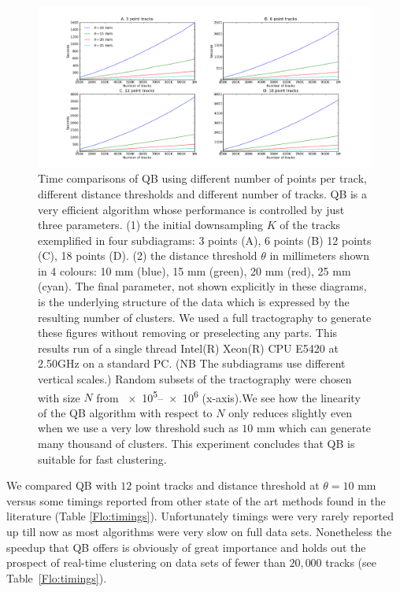 \documentclass[preprint,authoryear,a4paper,10pt,onecolumn]{elsarticle}
\begin{document}
\begin{figure}
\noindent \begin{centering}
\includegraphics[scale=0.33]{2x2+leg-box}
\par\end{centering}
\caption{Time comparisons of QB using different number of points per
  track, different distance thresholds and different number of
  tracks. QB is a very efficient algorithm whose performance is
  controlled by just three parameters. (1) the initial downsampling $K$
  of the tracks exemplified in four subdiagrams: 3 points (A), 6 points
  (B) 12 points (C), 18 points (D). (2) the distance threshold $\theta$
  in millimeters shown in 4 colours: 10 mm (blue), 15 mm (green), 20 mm
  (red), 25 mm (cyan). The final parameter, not shown explicitly in
  these diagrams, is the underlying structure of the data which is
  expressed by the resulting number of clusters.  We used a full
  tractography to generate these figures without removing or
  preselecting any parts. This results run of a single thread Intel(R)
  Xeon(R) CPU E5420 at 2.50GHz on a standard PC. (NB The subdiagrams use
  different vertical scales.) Random subsets of the tractography were
  chosen with size $N$ from \numrange{e5}{e6} (x-axis).We see how the
  linearity of the QB algorithm with respect to $N$ only reduces
  slightly even when we use a very low threshold such as $10$ mm which
  can generate many thousand of clusters. This experiment concludes that
  QB is suitable for fast clustering.\label{Flo:Speed1}}
\end{figure}

We compared QB with $12$ point tracks and distance threshold at
$\theta=10$ mm versus some timings reported from other state of the art
methods found in the literature (Table \ref{Flo:timings}). Unfortunately
timings were very rarely reported up till now as most algorithms were
very slow on full data sets. Nonetheless the speedup that QB offers is
obviously of great importance and holds out the prospect of real-time
clustering on data sets of fewer than $20,000$ tracks (see
Table~\ref{Flo:timings}).
\end{document}
